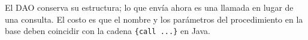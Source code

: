 \documentclass[10pt,a4paper]{article}
\begin{document}
El DAO conserva su estructura; lo que envía ahora es una llamada en lugar de una consulta. El costo es que el nombre y los parámetros del procedimiento en la base deben coincidir con la cadena \texttt{\{call ...\}} en Java.

\section{\color{colorIPN}{Referencias Bibliográficas}}
\nocite{*}
\color{colorESCOM}{
	\printbibliography[heading=none]
}
\end{document}
